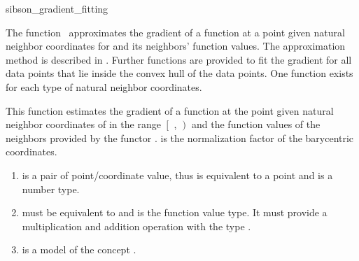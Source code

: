 
\begin{ccRefFunction}{sibson_gradient_fitting}  %

\ccDefinition
  
The function \ccRefName\ approximates the gradient of a function at a
point  given natural neighbor coordinates for  and its
neighbors' function values. The approximation method is described in
\cite{s-bdnni-81}. Further functions are provided to fit the gradient
for all data points that lie inside the convex hull of the data
points. One function exists for each type of natural neighbor
coordinates.


 { This function estimates the
  gradient of a function at the point  given natural neighbor
  coordinates of  in the range $\left[\right.$ ,
  $\left.\right)$ and the function values of the neighbors
  provided by the functor .   is the normalization
  factor of the barycentric coordinates.}

\begin{enumerate}
\item {} is a pair of point/coordinate
  value, thus  is
  equivalent to a point and
   is a
  number type. 
\item {} must be equivalent to
   and
   is the function value type. It must
  provide a multiplication and addition operation with the type
  .
\item  {} is a model of the concept 
  .
\end{enumerate}


\end{ccRefFunction}
